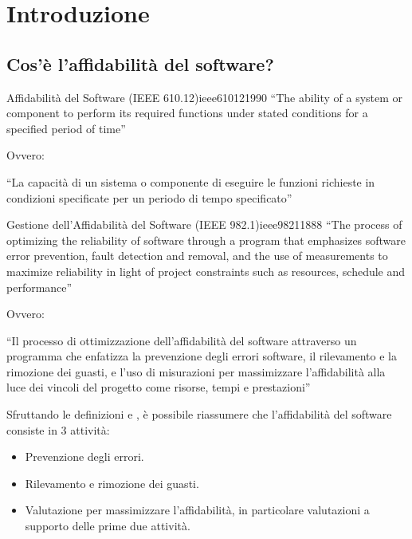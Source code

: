 \section{Introduzione}

\subsection{Cos'è l'affidabilità del software?}

\begin{definizione}{Affidabilità del Software (IEEE 610.12)}{ieee610121990}
``The ability of a system or component to perform its required functions
under stated conditions for a specified period of time''

Ovvero:

``La capacità di un sistema o componente di eseguire le funzioni richieste
in condizioni specificate per un periodo di tempo specificato''
\end{definizione}

\begin{definizione}{Gestione dell'Affidabilità del Software (IEEE 982.1)}{ieee98211888}
``The process of optimizing the reliability of software through a program that
emphasizes software error prevention, fault detection and removal, and the
use of measurements to maximize reliability in light of project constraints
such as resources, schedule and performance''

Ovvero:

``Il processo di ottimizzazione dell'affidabilità del software attraverso un
programma che enfatizza la prevenzione degli errori software, il rilevamento
e la rimozione dei guasti, e l'uso di misurazioni per massimizzare l'affidabilità
alla luce dei vincoli del progetto come risorse, tempi e prestazioni''

\end{definizione}

Sfruttando le definizioni  e ,
è possibile riassumere che l'affidabilità del software consiste in 3 attività:
\begin{itemize}
    \item Prevenzione degli errori.
    \item Rilevamento e rimozione dei guasti.
    \item Valutazione per massimizzare l'affidabilità, in particolare valutazioni
    a supporto delle prime due attività.
\end{itemize}

